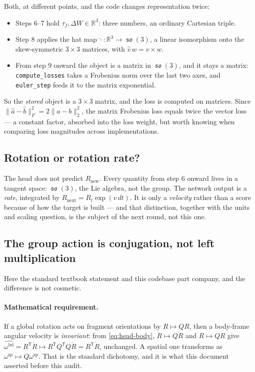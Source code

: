 \documentclass[11pt,a4paper]{report}
\theoremstyle{definition}
\theoremstyle{remark}
\DeclareMathOperator{\so}{\mathfrak{so}}
\newcommand{\RR}{\mathbb R}
\newcommand{\pyfunc}[1]{\texttt{#1}}
\begin{document}
Both, at different points, and the code changes representation twice:
\begin{itemize}
\item Steps 6--7 hold $\tau_f,\Delta W\in\RR^3$: three numbers, an ordinary
      Cartesian triple.
\item Step 8 applies the hat map
      $\widehat{\cdot}:\RR^3\to\so(3)$, a linear isomorphism onto the
      skew-symmetric $3\times3$ matrices, with $\widehat v\,w=v\times w$.
\item From step 9 onward the object is a matrix in $\so(3)$, and it stays a
      matrix: \pyfunc{compute\_losses} takes a Frobenius norm over the last
      two axes, and \pyfunc{euler\_step} feeds it to the matrix exponential.
\end{itemize}
So the \emph{stored} object is a $3\times3$ matrix, and the loss is computed
on matrices. Since $\|\widehat a-\widehat b\|_F^2=2\|a-b\|_2^2$, the matrix
Frobenius loss equals twice the vector loss --- a constant factor, absorbed
into the loss weight, but worth knowing when comparing loss magnitudes across
implementations.

\subsection{Rotation or rotation rate?}

The head does not predict $R_{\text{new}}$. Every quantity from step 6 onward
lives in a tangent space: $\so(3)$, the Lie algebra, not the group. The
network output is a \emph{rate}, integrated by
$R_{\text{next}}=R_t\exp(v\,dt)$. It is only a \emph{velocity} rather than a
score because of how the target is built --- and that distinction, together
with the units and scaling question, is the subject of the next round, not
this one.

\subsection{The group action is conjugation, not left multiplication}
\label{sec:head-group-action}

Here the standard textbook statement and this codebase part company, and the
difference is not cosmetic.

\paragraph{Mathematical requirement.} If a global rotation acts on fragment
orientations by $R\mapsto QR$, then a body-frame angular velocity is
\emph{invariant}: from \eqref{eq:head-body},
$\dot R\mapsto Q\dot R$ and $R\mapsto QR$ give
$\widehat{\omega^{\mathrm{bd}}}=R^{\mathsf T}\dot R\mapsto
R^{\mathsf T}Q^{\mathsf T}Q\dot R=R^{\mathsf T}\dot R$,
unchanged. A spatial one transforms as
$\omega^{\mathrm{sp}}\mapsto Q\omega^{\mathrm{sp}}$. That is the standard
dichotomy, and it is what this document asserted before this audit.
\end{document}
